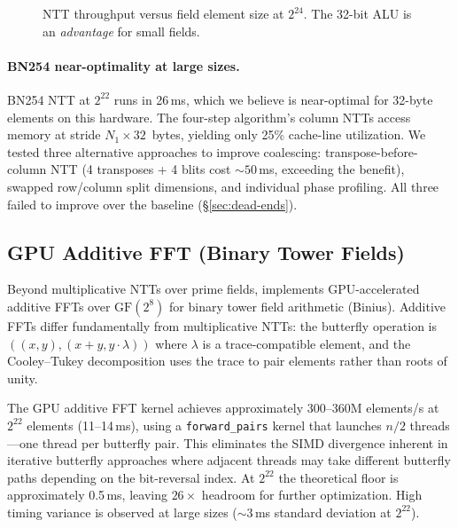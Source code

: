 \begin{figure}[t]
\centering
{}
\caption{NTT throughput versus field element size at $2^{24}$.
  The 32-bit ALU is an \emph{advantage} for small fields.}
\label{fig:ntt-throughput}
\end{figure}

\paragraph{BN254 near-optimality at large sizes.}
BN254 NTT at $2^{22}$ runs in 26\,ms, which we believe is near-optimal for
32-byte elements on this hardware. The four-step algorithm's column NTTs access
memory at stride $N_1 \times 32$~bytes, yielding only 25\% cache-line
utilization. We tested three alternative approaches to improve coalescing:
transpose-before-column NTT (4 transposes + 4 blits cost ${\sim}50$\,ms,
exceeding the benefit), swapped row/column split dimensions, and individual
phase profiling. All three failed to improve over the baseline
(\S\ref{sec:dead-ends}).

\subsection{GPU Additive FFT (Binary Tower Fields)}
\label{sec:additive-fft}

Beyond multiplicative NTTs over prime fields, \sys implements GPU-accelerated
additive FFTs over $\mathrm{GF}(2^8)$ for binary tower field arithmetic
(Binius).  Additive FFTs differ fundamentally from multiplicative NTTs: the
butterfly operation is $((x, y), (x + y, y \cdot \lambda))$ where
$\lambda$ is a trace-compatible element, and the Cooley--Tukey decomposition
uses the trace to pair elements rather than roots of unity.

The GPU additive FFT kernel achieves approximately $300$--$360$M elements/s at
$2^{22}$ elements (11--14\,ms), using a \texttt{forward\_pairs} kernel that
launches $n/2$ threads---one thread per butterfly pair.  This eliminates the
SIMD divergence inherent in iterative butterfly approaches where adjacent
threads may take different butterfly paths depending on the bit-reversal index.
At $2^{22}$ the theoretical floor is approximately 0.5\,ms, leaving
$26\times$ headroom for further optimization.  High timing variance is
observed at large sizes (${\sim}$3\,ms standard deviation at $2^{22}$).

